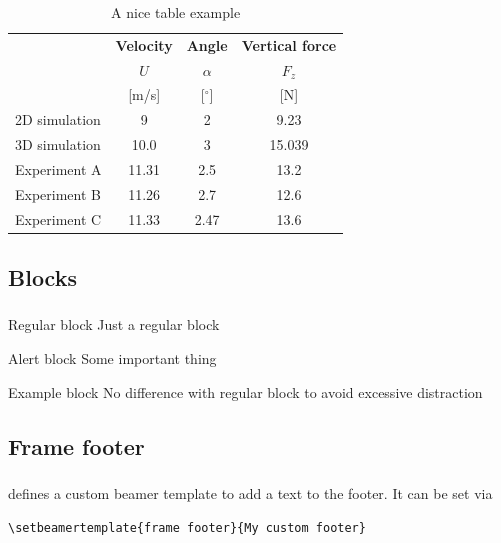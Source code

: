 \begin{frame}
  \frametitle{\insertsectionhead}
  \framesubtitle{\insertsubsectionhead}
  \begin{table}[H]
    \centering
    \caption{A nice table example}
    \begin{tabular}{@{} lccc @{}}
      \toprule
      & \textbf{Velocity} & \textbf{Angle}  & \textbf{Vertical force} \\
      & $U$ & $\alpha$  & $F_z$ \\
      & [m/s] & [$^\circ$]  & [N] \\
      \midrule
      2D simulation  & 9 & 2 & 9.23 \\
      3D simulation  & 10.0 & 3 & 15.039 \\
      Experiment A   & 11.31 & 2.5 & 13.2 \\
      Experiment B   & 11.26 & 2.7 & 12.6 \\
      Experiment C   & 11.33 & 2.47 & 13.6 \\
      \bottomrule
    \end{tabular}
  \end{table}

\end{frame}

\subsection{Blocks}

\begin{frame}
  \frametitle{\insertsectionhead}
  \framesubtitle{\insertsubsectionhead}
  \begin{block}{Regular block}
    Just a regular block
  \end{block}
  \begin{alertblock}{Alert block}
    Some important thing
  \end{alertblock}
  \begin{exampleblock}{Example block}
    No difference with regular block to avoid excessive distraction
  \end{exampleblock}
\end{frame}

\subsection{Frame footer}

{
  \begin{frame}[fragile]
    \frametitle{\insertsectionhead}
    \framesubtitle{\insertsubsectionhead}
    \themename defines a custom beamer template to add a text to the footer. It can be set via
    \begin{verbatim}\setbeamertemplate{frame footer}{My custom footer}\end{verbatim}
  \end{frame}
}

